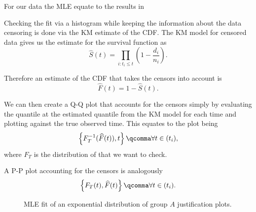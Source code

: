 For our data the \ac{MLE} equate to the results in 

\begin{table}[h]
    \centering
    
    \caption{\ac{MLE} estimates for the exponential distribution of \(F_T\).}
    \label{tab:MLE_exponential}
\end{table}

Checking the fit via a histogram while keeping the information about the data censoring is done via the \ac{KM}
estimate of the \ac{CDF}. The \ac{KM} model for censored data gives us the estimate for the survival function as
\[
    \widehat{S}(t)=\prod_{i:t_{i}\leq t}\left(1-{\frac{d_{i}}{n_{i}}}\right).
\] 

Therefore an estimate of the \ac{CDF} that takes the censors into account is 
\[
    \widehat{F}(t)=1-\widehat{S}(t).
\]

We can then create a Q-Q plot that accounts for the censors simply by evaluating the quantile at the
estimated quantile from the \ac{KM} model for each time and plotting against the true observed time. This equates to the
plot being \[
    \left\{ F^{-1}_T(\widehat{F}(t)), t  \right\} \qcomma  \forall t \in (t_i),
\]  where \(F_T\) is the distribution of that we want to check.

A P-P plot accounting for the censors is analogously \[
    \left\{ F_T(t), \widehat{F}(t) \right\} \qcomma  \forall t \in (t_i).
\] 


\begin{figure}[h]
    \centering
    \begin{subfigure}{0.4\textwidth}
    \end{subfigure} 
    \begin{subfigure}{0.4\textwidth}
    \end{subfigure} 
    \begin{subfigure}{0.4\textwidth}
    \end{subfigure}
    \caption{\ac{MLE} fit of an exponential distribution of group \(A\) justification plots.}
    \label{fig:histogram_vs_parametric_and_QQ_A}
\end{figure}

